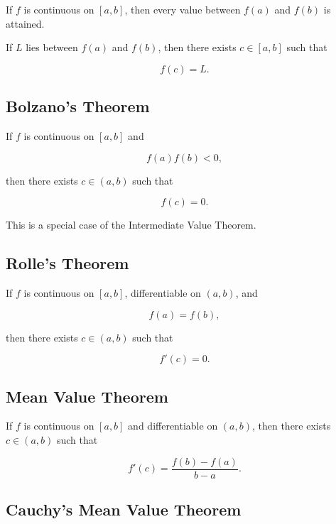 If \(f\) is continuous on \([a,b]\), then every value between \(f(a)\) and
\(f(b)\) is attained.

If \(L\) lies between \(f(a)\) and \(f(b)\), then there exists \(c\in[a,b]\)
such that

\[
\boxed{
f(c)=L.
}
\]

\subsection{Bolzano's Theorem}
\label{subsec:bolzano-theorem-summary}

If \(f\) is continuous on \([a,b]\) and

\[
f(a)f(b)<0,
\]

then there exists \(c\in(a,b)\) such that

\[
\boxed{
f(c)=0.
}
\]

This is a special case of the Intermediate Value Theorem.

\subsection{Rolle's Theorem}
\label{subsec:rolles-theorem-summary}

If \(f\) is continuous on \([a,b]\), differentiable on \((a,b)\), and

\[
f(a)=f(b),
\]

then there exists \(c\in(a,b)\) such that

\[
\boxed{
f'(c)=0.
}
\]

\subsection{Mean Value Theorem}
\label{subsec:mean-value-theorem-summary}

If \(f\) is continuous on \([a,b]\) and differentiable on \((a,b)\), then
there exists \(c\in(a,b)\) such that

\[
\boxed{
f'(c)
=
\frac{
f(b)-f(a)
}{
b-a
}.
}
\]

\subsection{Cauchy's Mean Value Theorem}
\label{subsec:cauchy-mvt-summary}

